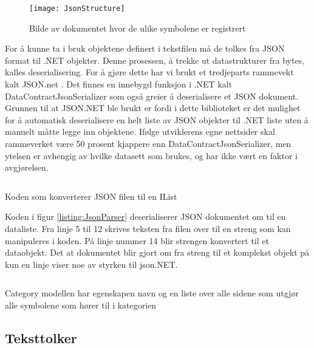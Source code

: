 { 
 \begin{figure}[ht!] 
\centering 
\texttt{[image: JsonStructure]} 
\caption{Bilde av dokumentet hvor de ulike symbolene er registrert} 
\label{fig:jsonstructure} 
\end{figure} 


For å kunne ta i bruk objektene definert i tekstfilen må de tolkes fra JSON format til .NET objekter. Denne prosessen, å trekke ut datastrukturer fra bytes, kalles deserialisering. For å gjøre dette har vi brukt et tredjeparts rammevekt kalt JSON.net \cite{Json.0:online}. Det finnes en innebygd funksjon i .NET kalt DataContractJsonSerializer \cite{DataC3:online} som også greier å deserialisere et JSON dokument. Grunnen til at JSON.NET ble brukt er fordi i dette biblioteket er det mulighet for å automatisk deserialisere en helt liste av JSON objekter til .NET liste uten å manuelt måtte legge inn objektene. Ifølge utviklerens egne nettsider skal rammeverket være 50 prosent kjappere enn DataContractJsonSerializer, men ytelsen er avhengig av hvilke datasett som brukes, og har ikke vært en faktor i avgjørelsen. 


\begin{listing}[ht] 
\inputminted[fontsize=\footnotesize, frame=lines,framesep=2mm,baselinestretch=1.2,bgcolor=lightgray,linenos]{csharp}{Code/JSONparser.cs} 
\caption{Koden som konverterer JSON filen til en IList} 
\label{listing:JsonParser} 
\end{listing} 


Koden i figur \ref{listing:JsonParser} deserialiserer JSON dokumentet om til en dataliste. Fra linje 5 til 12 skrives teksten fra filen over til en streng som kan manipuleres i koden. På linje nummer 14 blir strengen konvertert til et dataobjekt. Det at dokumentet blir gjort om fra streng til et komplekst objekt på kun en linje viser noe av styrken til json.NET. 

\begin{listing}[ht] 
\inputminted[fontsize=\footnotesize, frame=lines,framesep=2mm,baselinestretch=1.2,bgcolor=lightgray,linenos]{csharp}{Code/CategoryModel.cs} 
\caption{Category modellen har egenskapen navn og en liste over alle sidene som utgjør alle symbolene som hører til i kategorien} 
\label{listing:CategoryModel} 
\end{listing} 


\subsection{Teksttolker}

}
